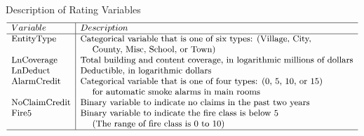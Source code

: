\documentclass[]{book}
\theoremstyle{definition}
\theoremstyle{definition}
\theoremstyle{definition}
\theoremstyle{remark}
\begin{document}
Description of Rating Variables \[{\small \begin{matrix}
\begin{array}{ l | l}
\hline
Variable    & Description \\
\hline
\text{EntityType}   & \text{Categorical variable that is one of six types:  (Village, City,} \\
& ~~~~ \text{County, Misc, School, or Town)} \\
\text{LnCoverage}   & \text{Total building and content coverage, in logarithmic millions of dollars}\\
\text{LnDeduct}     & \text{Deductible, in logarithmic dollars} \\
\text{AlarmCredit}  & \text{Categorical variable that is one of four types:  (0, 5, 10, or 15)} \\
 &  ~~~~   \text{for automatic smoke alarms in main rooms} \\
\text{NoClaimCredit}    & \text{Binary variable to indicate no claims in the past two years} \\
\text{Fire5 }           & \text{Binary variable to indicate the fire class is below 5} \\
& ~~~~ \text{(The range of fire class is 0 to 10)} \\
\hline
\end{array}
\end{matrix}}\]
\end{document}
